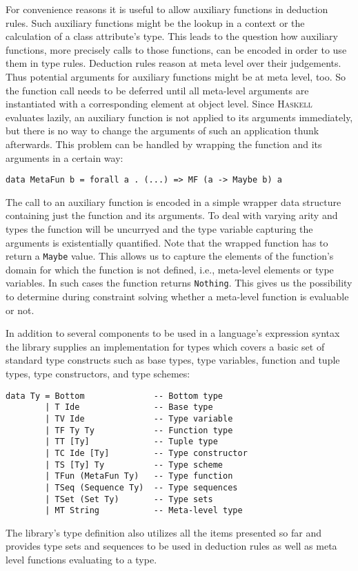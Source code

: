 For convenience reasons it is useful to allow auxiliary functions in
deduction rules.  Such auxiliary functions might be the lookup in a
context or the calculation of a class attribute's type. This leads to
the question how auxiliary functions, more precisely calls to those
functions, can be encoded in order to use them in type rules.
Deduction rules reason at meta level over their judgements. Thus
potential arguments for auxiliary functions might be at meta level,
too. So the function call needs to be deferred until all meta-level
arguments are instantiated with a corresponding element at object
level. Since \textsc{Haskell} evaluates lazily, an auxiliary function is
not applied to its arguments immediately, but there is no way to
change the arguments of such an application thunk afterwards. This
problem can be handled by wrapping the function and its arguments in a
certain way:
\begin{lstlisting}
data MetaFun b = forall a . (...) => MF (a -> Maybe b) a
\end{lstlisting}
The call to an auxiliary function is encoded in a simple wrapper data
structure containing just the function and its arguments. To deal with
varying arity and types the function will be uncurryed and the type
variable capturing the arguments is existentially quantified. Note
that the wrapped function has to return a \texttt{Maybe} value. This
allows us to capture the elements of the function's domain for which
the function is not defined, i.e., meta-level elements or type
variables. In such cases the function returns \texttt{Nothing}. This
gives us the possibility to determine during constraint solving
whether a meta-level function is evaluable or not.

In addition to several components to be used in a language's
expression syntax the library supplies an implementation for types
which covers a basic set of standard type constructs such as base
types, type variables, function and tuple types, type constructors,
and type schemes:
\begin{lstlisting}
data Ty = Bottom              -- Bottom type
        | T Ide               -- Base type
        | TV Ide              -- Type variable
        | TF Ty Ty            -- Function type
        | TT [Ty]             -- Tuple type
        | TC Ide [Ty]         -- Type constructor
        | TS [Ty] Ty          -- Type scheme
        | TFun (MetaFun Ty)   -- Type function
        | TSeq (Sequence Ty)  -- Type sequences
        | TSet (Set Ty)       -- Type sets
        | MT String           -- Meta-level type
\end{lstlisting}
The library's type definition also utilizes all the items presented so
far and provides type sets and sequences to be used in deduction rules
as well as meta level functions evaluating to a type.

